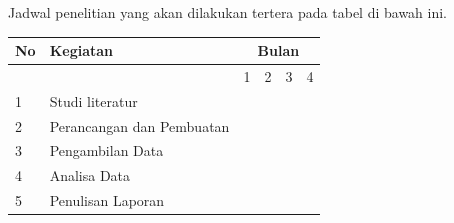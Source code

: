 \documentclass[a4paper,12pt]{article}
\begin{document}
Jadwal penelitian yang akan dilakukan tertera pada tabel di bawah ini.

\begin{center}
 \begin{tabular}{ |l|l|l|l|l|l| }
   \hline
   No & Kegiatan & \multicolumn{4}{|c|}{Bulan} \\
   \hline
     &  & 1 & 2 & 3 & 4 \\
   \hline
   1 & Studi literatur & \cellcolor{blue} & \cellcolor{blue} & \cellcolor{blue} & \\
   \hline
   2 & Perancangan dan Pembuatan & & \cellcolor{blue} & \cellcolor{blue} & \\
   \hline
   3 & Pengambilan Data & & & \cellcolor{blue} & \cellcolor{blue} \\
   \hline
   4 & Analisa Data & & & & \cellcolor{blue} \\
   \hline
   5 & Penulisan Laporan & & & \cellcolor{blue} & \cellcolor{blue} \\
  \hline
\end{tabular}
\end{center}
\end{document}
